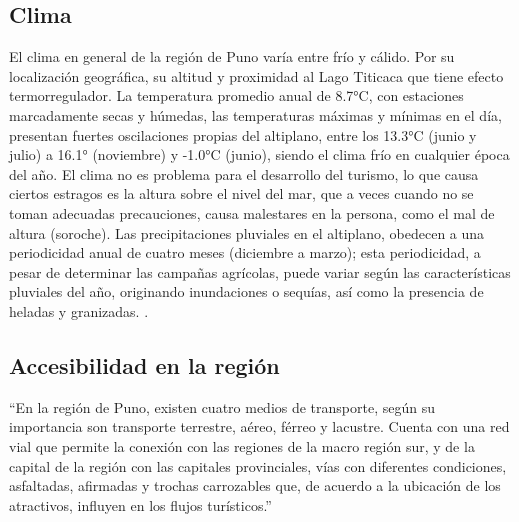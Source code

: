 \subsection{Clima}
El clima en general de la región de Puno varía entre frío y cálido. Por su localización geográfica, su altitud y proximidad al Lago Titicaca que tiene efecto termorregulador. La temperatura promedio anual de 8.7°C, con estaciones marcadamente secas y húmedas, las temperaturas máximas y mínimas en el día, presentan fuertes oscilaciones propias del altiplano, entre los 13.3°C (junio y julio) a 16.1° (noviembre) y -1.0°C (junio), siendo el clima frío en cualquier época del año. El clima no es problema para el desarrollo del turismo, lo que causa ciertos estragos es la altura sobre el nivel del mar, que a veces cuando no se toman adecuadas precauciones, causa malestares en la persona, como el mal de altura (soroche). Las precipitaciones pluviales en el altiplano, obedecen a una periodicidad anual de cuatro meses (diciembre a marzo); esta periodicidad, a pesar de determinar las campañas agrícolas, puede variar según las características pluviales del año, originando inundaciones o sequías, así como la presencia de heladas y granizadas. \cite{2011PlanPERTUR,2016CarpetaPeru}.

\subsection{Accesibilidad en la región}
“En la región de Puno, existen cuatro medios de transporte, según su importancia son transporte terrestre, aéreo, férreo y lacustre. Cuenta con una red vial que permite la conexión con las regiones de la macro región sur, y de la capital de la región con las capitales provinciales, vías con diferentes condiciones, asfaltadas, afirmadas y trochas carrozables que, de acuerdo a la ubicación de los atractivos, influyen en los flujos turísticos.” \cite{2011PlanPERTUR}

